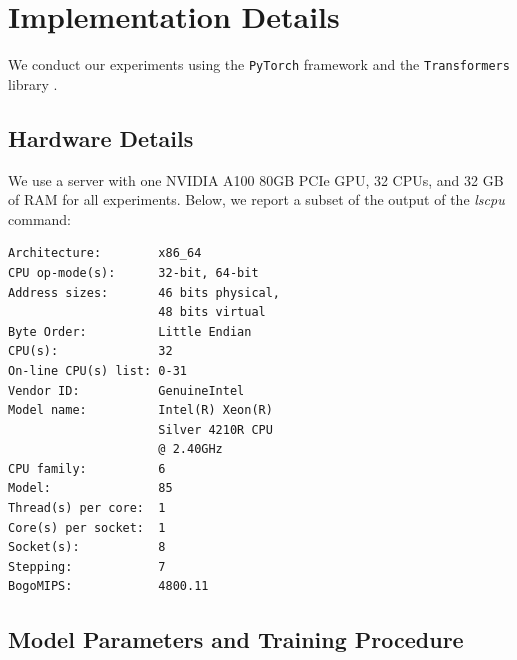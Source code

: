 \section{Implementation Details}\label{app:15-implementation_details}

We conduct our experiments using the \texttt{PyTorch} framework \citep{paszke-etal-2019-pytorch} and the \texttt{Transformers} library \citep{wolf-etal-2020-transformers}.

\subsection{Hardware Details}

We use a server with one NVIDIA A100 80GB PCIe GPU, 32 CPUs, and 32 GB of RAM for all experiments. Below, we report a subset of the output of the \emph{lscpu} command:

\begin{tcolorbox}[left=5pt,right=5pt,top=5pt,bottom=5pt]
\small
\begin{verbatim}
Architecture:        x86_64
CPU op-mode(s):      32-bit, 64-bit
Address sizes:       46 bits physical, 
                     48 bits virtual
Byte Order:          Little Endian
CPU(s):              32
On-line CPU(s) list: 0-31
Vendor ID:           GenuineIntel
Model name:          Intel(R) Xeon(R)
                     Silver 4210R CPU
                     @ 2.40GHz
CPU family:          6
Model:               85
Thread(s) per core:  1
Core(s) per socket:  1
Socket(s):           8
Stepping:            7
BogoMIPS:            4800.11
\end{verbatim}
\end{tcolorbox}

\subsection{Model Parameters and Training Procedure}

